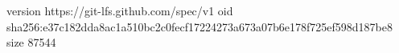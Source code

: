 version https://git-lfs.github.com/spec/v1
oid sha256:e37c182dda8ac1a510bc2c0fecf17224273a673a07b6e178f725ef598d187be8
size 87544
